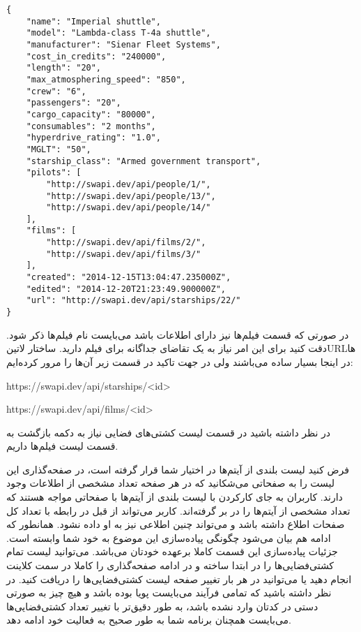 \begin{latin}
\begin{verbatim}
{
    "name": "Imperial shuttle",
    "model": "Lambda-class T-4a shuttle",
    "manufacturer": "Sienar Fleet Systems",
    "cost_in_credits": "240000",
    "length": "20",
    "max_atmosphering_speed": "850",
    "crew": "6",
    "passengers": "20",
    "cargo_capacity": "80000",
    "consumables": "2 months",
    "hyperdrive_rating": "1.0",
    "MGLT": "50",
    "starship_class": "Armed government transport",
    "pilots": [
        "http://swapi.dev/api/people/1/",
        "http://swapi.dev/api/people/13/",
        "http://swapi.dev/api/people/14/"
    ],
    "films": [
        "http://swapi.dev/api/films/2/",
        "http://swapi.dev/api/films/3/"
    ],
    "created": "2014-12-15T13:04:47.235000Z",
    "edited": "2014-12-20T21:23:49.900000Z",
    "url": "http://swapi.dev/api/starships/22/"
}
\end{verbatim}
\end{latin}

در صورتی که قسمت فیلم‌ها نیز دارای اطلاعات باشد می‌بایست نام فیلم‌ها ذکر شود.
دقت کنید برای این امر نیاز به یک تقاضای جداگانه برای فیلم دارید. ساختار ‌لاتین{URL}ها در اینجا بسیار ساده می‌باشند ولی در جهت تاکید در قسمت زیر آن‌ها را مرور کرده‌ایم:

\begin{itemize}\begin{latinitems}
  \item https://swapi.dev/api/starships/<id>
  \item https://swapi.dev/api/films/<id>
\end{latinitems}\end{itemize}

در نظر داشته باشید در قسمت لیست کشتی‌های فضایی نیاز به دکمه بازگشت به قسمت لیست فیلم‌ها داریم.


فرض کنید لیست بلندی از آیتم‌ها در اختیار شما قرار گرفته است، در صفحه‌گذاری این لیست را به صفحاتی می‌شکانید که در هر صفحه تعداد مشخصی از اطلاعات وجود دارند. کاربران به جای کارکردن با لیست بلندی از آیتم‌ها با صفحاتی مواجه هستند که تعداد مشخصی از آیتم‌ها را در بر گرفته‌اند. کاربر می‌تواند از قبل در رابطه با تعداد کل صفحات اطلاع داشته باشد و می‌تواند چنین اطلاعی نیز به او داده نشود. همانطور که ادامه هم بیان می‌شود چگونگی پیاده‌سازی این موضوع به خود شما وابسته است.
جزئیات پیاده‌سازی این قسمت کاملا برعهده خودتان می‌باشد.
می‌توانید لیست تمام کشتی‌فضایی‌ها را در ابتدا ساخته و در ادامه صفحه‌گذاری را کاملا در سمت کلاینت انجام دهید یا می‌توانید در هر بار تغییر صفحه لیست کشتی‌فضایی‌ها را دریافت کنید.
در نظر داشته باشید که تمامی فرآیند می‌بایست پویا بوده باشد و هیچ چیز به صورتی دستی در کدتان وارد نشده باشد، به طور دقیق‌تر با تغییر تعداد کشتی‌فضایی‌ها می‌بایست همچنان برنامه شما به طور صحیح به فعالیت خود ادامه دهد.

